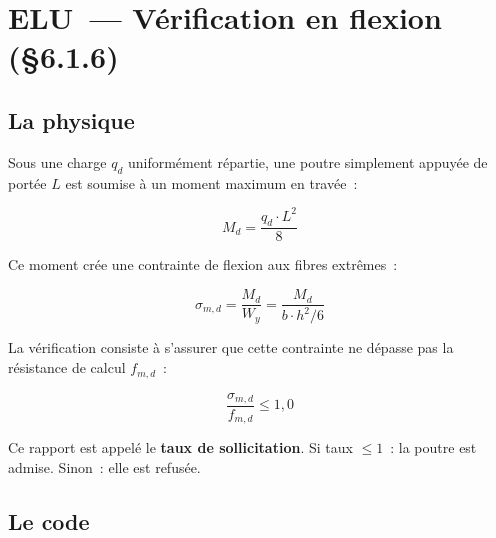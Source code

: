 \section{ELU~--- V\'erification en flexion (\S{}6.1.6)}

\subsection{La physique}

Sous une charge $q_d$ uniform\'ement r\'epartie, une poutre simplement
appuy\'ee de port\'ee $L$ est soumise \`a un moment maximum en trav\'ee~:

\begin{equation}
M_{d} = \frac{q_d \cdot L^2}{8}
\label{eq:moment}
\end{equation}

Ce moment cr\'ee une contrainte de flexion aux fibres extr\^emes~:

\begin{equation}
\sigma_{m,d} = \frac{M_d}{W_y} = \frac{M_d}{b \cdot h^2 / 6}
\label{eq:sigma}
\end{equation}

La v\'erification consiste \`a s'assurer que cette contrainte ne d\'epasse
pas la r\'esistance de calcul $f_{m,d}$~:

\begin{equation}
\frac{\sigma_{m,d}}{f_{m,d}} \leq 1{,}0
\label{eq:taux_flex}
\end{equation}

Ce rapport est appel\'e le \textbf{taux de sollicitation}.
Si taux $\leq 1$~: la poutre est admise. Sinon~: elle est refus\'ee.

\subsection{Le code}

